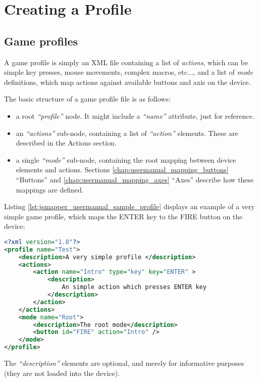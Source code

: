 \section{Creating a Profile}

\subsection{Game profiles}
A game profile is simply an XML file containing a list of \emph{actions}, which can be simple key presses, mouse movements, complex macros, etc..., and a list of \emph{mode} definitions, which map actions against available buttons and axis on the device.  

The basic structure of a game profile file is as follows:
\begin{itemize}
	\item a root \emph{``profile''} node. It might include a \emph{``name''} attribute, just for reference.
	\item an \emph{``actions''} sub-node, containing a list of \emph{``action''} elements. These are described in the Actions section.
	\item a single \emph{``mode''} sub-node, containing the root mapping between device elements and actions. Sections \ref{chap:usermanual_mapping_buttons} ``Buttons'' and \ref{chap:usermanual_mapping_axes} ``Axes'' describe how these mappings are defined.
\end{itemize}

Listing \ref{lst:jsmapper_usermanual_sample_profile} displays an example of a very simple game profile, which maps the ENTER key to the FIRE button on the device:
\begin{lstlisting}[language=XML,caption={Example profile},label={lst:jsmapper_usermanual_sample_profile}]
<?xml version="1.0"?>
<profile name="Test">
	<description>A very simple profile </description>
	<actions>
		<action name="Intro" type="key" key="ENTER" >
			<description>
				An simple action which presses ENTER key
			</description>
		</action>
	</actions>  
	<mode name="Root">
		<description>The root mode</description>
		<button id="FIRE" action="Intro" />
	</mode>
</profile>
\end{lstlisting}

The \emph{``description''} elements are optional, and merely for informative purposes (they are not loaded into the device).


